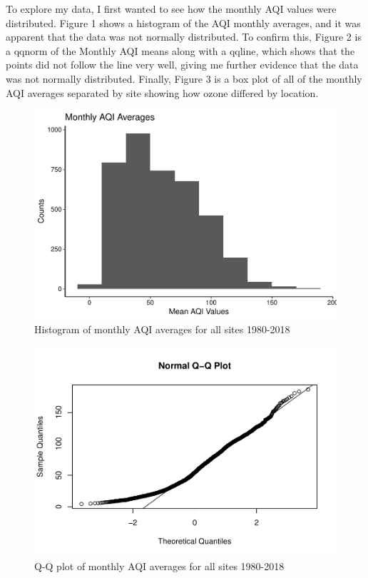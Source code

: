 \documentclass[12pt,]{article}
\begin{document}
To explore my data, I first wanted to see how the monthly AQI values
were distributed. Figure 1 shows a histogram of the AQI monthly
averages, and it was apparent that the data was not normally
distributed. To confirm this, Figure 2 is a qqnorm of the Monthly AQI
means along with a qqline, which shows that the points did not follow
the line very well, giving me further evidence that the data was not
normally distributed. Finally, Figure 3 is a box plot of all of the
monthly AQI averages separated by site showing how ozone differed by
location.

\begin{figure}
\centering
\includegraphics{Roth_ENV872_Project_files/figure-latex/exploratory graph1-1.pdf}
\caption{Histogram of monthly AQI averages for all sites 1980-2018}
\end{figure}

\begin{figure}
\centering
\includegraphics{Roth_ENV872_Project_files/figure-latex/exploratory graph2-1.pdf}
\caption{Q-Q plot of monthly AQI averages for all sites 1980-2018}
\end{figure}
\end{document}
